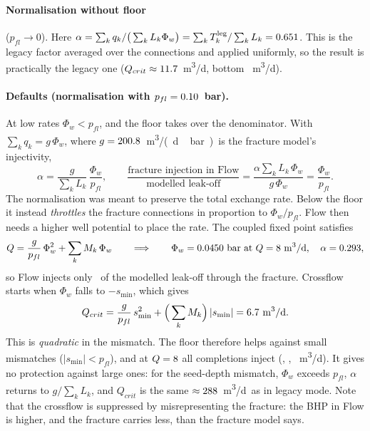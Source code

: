 \documentclass[11pt,a4paper]{article}
\newcommand{\Phiw}{\Phi_w}
\newcommand{\rated}{\si{m^3/d}}
\newcommand{\cond}{\si{m^3/(d\,bar)}}
\begin{document}
\paragraph{Normalisation without floor} ($p_{fl}\to0$).  Here
$\alpha=\sum_k q_k/\big(\sum_k L_k\Phiw\big)=\sum_k T^{\text{leg}}_k/\sum_k L_k=\alphaCF$.
This is the legacy factor averaged over the connections and applied uniformly, so the result is
practically the legacy one ($Q_{crit}\approx11.7$~\rated, bottom \qCFbot~\rated).

\paragraph{Defaults (normalisation with $p_{fl}=0.10$~bar).}  At low rates
$\Phiw<p_{fl}$, and the floor takes over the denominator.  With $\sum_k q_k=g\,\Phiw$, where
$g=200.8$~\cond\ is the fracture model's injectivity,
\begin{equation}
  \alpha=\frac{g}{\sum_k L_k}\,\frac{\Phiw}{p_{fl}},\qquad
  \frac{\text{fracture injection in Flow}}{\text{modelled leak-off}}
  =\frac{\alpha\sum_k L_k\,\Phiw}{g\,\Phiw}=\frac{\Phiw}{p_{fl}}.
  \label{eq:share}
\end{equation}
The normalisation was meant to preserve the total exchange rate.  Below the floor it instead
\emph{throttles} the fracture connections in proportion to $\Phiw/p_{fl}$.  Flow then needs a
higher well potential to place the rate.  The coupled fixed point satisfies
\begin{equation}
  Q=\frac{g}{p_{fl}}\,\Phiw^2+\sum_k M_k\,\Phiw
  \qquad\Longrightarrow\qquad \Phiw=\phiwCD~\text{bar at }Q=\Qbase~\text{\rated},\quad \alpha=\alphaCD,
\end{equation}
so Flow injects only \shareCD\ of the modelled leak-off through the fracture.  Crossflow starts
when $\Phiw$ falls to $-s_{\min}$, which gives
\begin{equation}
  Q_{crit}=\frac{g}{p_{fl}}\,s_{\min}^2+\Big(\sum_k M_k\Big)\,|s_{\min}|=\QcritFloorAn~\text{\rated}.
\end{equation}
This is \emph{quadratic} in the mismatch.  The floor therefore helps against small mismatches
($|s_{\min}|<p_{fl}$), and at $Q=8$ all completions inject
(\qCDtop, \qCDmid, \qCDbot~\rated).  It gives no protection against large ones: for the
seed-depth mismatch, $\Phiw$ exceeds $p_{fl}$, $\alpha$ returns to $g/\sum_k L_k$, and $Q_{crit}$
is the same $\approx288$~\rated\ as in legacy mode.  Note that the crossflow is suppressed
by misrepresenting the fracture: the BHP in Flow is higher, and the fracture carries less,
than the fracture model says.
\end{document}
